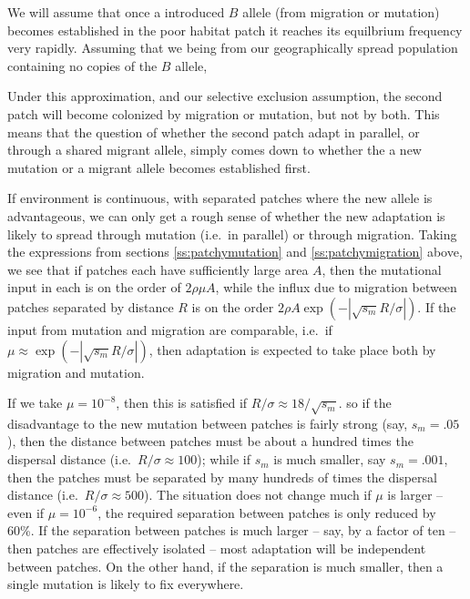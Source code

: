 \documentclass{article}
\begin{document}
{We will assume that once a introduced $B$ allele (from migration or mutation) becomes
established in the poor habitat patch it reaches its equilbrium
frequency very rapidly. Assuming that we being from our geographically 
spread population containing no copies of the $B$ allele, 



Under this approximation, and our selective
exclusion assumption, the second patch will become colonized by migration or
mutation, but not by both. This means that the question of whether the
second patch adapt in parallel, or through a shared migrant allele,
simply comes down to whether the a new mutation or a migrant allele
becomes established first. 



If environment is continuous, with separated patches where the new allele is advantageous,
we can only get a rough sense of whether the new adaptation is likely to spread through mutation (i.e.\ in parallel)
or through migration.
Taking the expressions from sections \ref{ss:patchymutation} and \ref{ss:patchymigration} above,
we see that if patches each have sufficiently large area $A$,
then the mutational input in each is on the order of $2 \rho \mu A$,
while the influx due to migration between patches separated by distance $R$ is on the order $2 \rho A \exp(- |\sqrt{s_m} R/\sigma|)$. 
If the input from mutation and migration are comparable, i.e.\ if $\mu \approx \exp( -|\sqrt{s_m} R/\sigma| )$,
then adaptation is expected to take place both by migration and
mutation.


If we take $\mu = 10^{-8}$, then this is satisfied if $R/\sigma \approx 18/\sqrt{s_m}$.
so if the disadvantage to the new mutation between patches is fairly strong (say, $s_m=.05$),
then the distance between patches must be about a hundred times the dispersal distance (i.e.\ $R/\sigma \approx 100$);
while if $s_m$ is much smaller, say $s_m = .001$, 
then the patches must be separated by many hundreds of times the dispersal distance (i.e.\ $R/\sigma \approx 500$).
The situation does not change much if $\mu$ is larger -- even if $\mu = 10^{-6}$, 
the required separation between patches is only reduced by 60\%.
If the separation between patches is much larger -- say, by a factor of ten -- 
then patches are effectively isolated -- most adaptation will be independent between patches.
On the other hand, if the separation is much smaller, then a single mutation is likely to fix everywhere.

}
\end{document}
